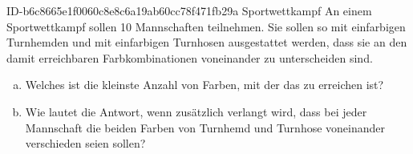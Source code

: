 \begin{exercise}
      {ID-b6c8665e1f0060c8e8c6a19ab60cc78f471fb29a}
      {Sportwettkampf}
  \ifproblem\problem
    An einem Sportwettkampf sollen 10 Mannschaften teilnehmen. Sie sollen
    so mit einfarbigen Turnhemden und mit einfarbigen Turnhosen ausgestattet
    werden, dass sie an den damit erreichbaren Farbkombinationen voneinander
    zu unterscheiden sind.
    \begin{enumerate}[a)]
      \item Welches ist die kleinste Anzahl von Farben, mit der das zu
            erreichen ist?
      \item Wie lautet die Antwort, wenn zusätzlich verlangt wird, dass bei
            jeder Mannschaft die beiden Farben von Turnhemd und Turnhose
            voneinander verschieden seien sollen?
    \end{enumerate}
  \fi
\end{exercise}
